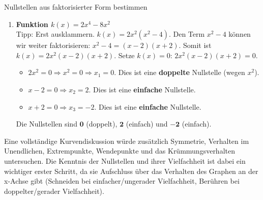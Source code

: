 \begin{loesungsumgebung}{Nullstellen aus faktorisierter Form bestimmen}
\begin{enumerate}[label=(\alph*)]
    \item \textbf{Funktion $k(x) = 2x^4 - 8x^2$} \\
    Tipp: Erst ausklammern.
    $k(x) = 2x^2(x^2-4)$.
    Den Term $x^2-4$ können wir weiter faktorisieren: $x^2-4 = (x-2)(x+2)$.
    Somit ist $k(x) = 2x^2(x-2)(x+2)$.
    Setze $k(x)=0$: $2x^2(x-2)(x+2) = 0$.
    \begin{itemize}
        \item $2x^2 = 0 \Rightarrow x^2=0 \Rightarrow x_1 = 0$. Dies ist eine \textbf{doppelte} Nullstelle (wegen $x^2$).
        \item $x-2 = 0 \Rightarrow x_2 = 2$. Dies ist eine \textbf{einfache} Nullstelle.
        \item $x+2 = 0 \Rightarrow x_3 = -2$. Dies ist eine \textbf{einfache} Nullstelle.
    \end{itemize}
    Die Nullstellen sind $\mathbf{0}$ (doppelt), $\mathbf{2}$ (einfach) und $\mathbf{-2}$ (einfach).
\end{enumerate}
Eine vollständige Kurvendiskussion würde zusätzlich Symmetrie, Verhalten im Unendlichen, Extrempunkte, Wendepunkte und das Krümmungsverhalten untersuchen. Die Kenntnis der Nullstellen und ihrer Vielfachheit ist dabei ein wichtiger erster Schritt, da sie Aufschluss über das Verhalten des Graphen an der x-Achse gibt (Schneiden bei einfacher/ungerader Vielfachheit, Berühren bei doppelter/gerader Vielfachheit).
\end{loesungsumgebung}




